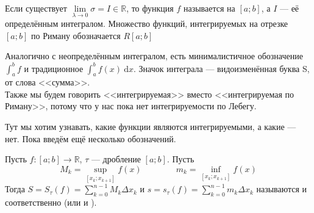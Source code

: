 \documentclass{article}
\begin{document}
\begin{itemize}
\begin{Comment}
        \end{Comment}
        \dfn Если существует $\lim\limits_{\lambda\to0}\sigma=I\in\mathbb R$, то функция $f$ называется  на $[a;b]$, а $I$ --- её определённым интегралом. Множество функций, интегрируемых на отрезке $[a;b]$ по Риману обозначается $R[a;b]$
        \begin{Comment}
            Аналогично с неопределённым интегралом, есть минималистичное обозначение $\int_a^bf$ и традиционное $\int_a^bf(x)~\mathrm dx$. Значок интеграла --- видоизменённая буква S, от слова <<сумма>>.\\
            Также мы будем говорить <<интегрируемая>> вместо <<интегрируемая по Риману>>, потому что у нас пока нет интегрируемости по Лебегу.
        \end{Comment}
        \begin{Comment}
            Тут мы хотим узнавать, какие функции являются интегрируемыми, а какие --- нет. Пока введём ещё несколько обозначений.
        \end{Comment}
        \dfn Пусть $f\colon[a;b]\to\mathbb R$, $\tau$ --- дробление $[a;b]$. Пусть
        $$M_k=\sup\limits_{[x_k;x_{k+1}]}f(x)\qquad\qquad m_k=\inf\limits_{[x_k;x_{k+1}]}f(x)$$
        Тогда $S=S_\tau(f)=\sum\limits_{k=0}^{n-1}M_k\Delta x_k$ и $s=s_\tau(f)=\sum\limits_{k=0}^{n-1}m_k\Delta x_k$ называются  и \\ соответственно (или  и ).
        \begin{Comment}
            \begin{center}
\end{center}
\end{Comment}
\end{itemize}
\end{document}
